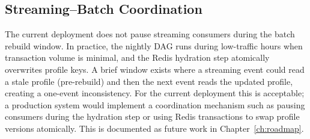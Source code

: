 \subsection{Streaming--Batch Coordination}

The current deployment does not pause streaming consumers during the batch
rebuild window. In practice, the nightly DAG runs during low-traffic hours
when transaction volume is minimal, and the Redis hydration step atomically
overwrites profile keys. A brief window exists where a streaming event could
read a stale profile (pre-rebuild) and then the next event reads the updated
profile, creating a one-event inconsistency. For the current deployment this
is acceptable; a production system would implement a coordination mechanism
such as pausing consumers during the hydration step or using Redis
transactions to swap profile versions atomically. This is documented as
future work in Chapter~\ref{ch:roadmap}.